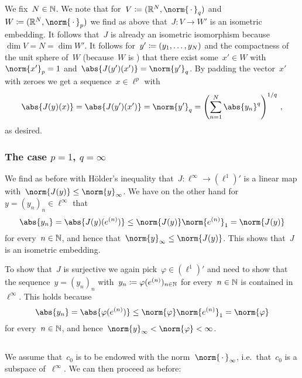 We fix~$N \in \mathbb{N}$.
We note that for~$V \defined (\Real^N, \norm{\,\cdot\,}_q)$ and~$W \defined (\Real^N, \norm{\,\cdot\,}_p)$ we find as above that~$J \colon V \to W'$ is an isometric embedding.
It follows that~$J$ is already an isometric isomorphism because~$\dim V = N = \dim W'$.
It follows for~$y' \coloneqq (y_1, \dotsc, y_N)$ and the compactness of the unit sphere of~$W$ (because~$W$ is {\fd}) that there exist some~$x' \in W$ with~$\norm{x'}_p = 1$ and~$\abs{J(y')(x')} = \norm{y'}_q$.
By padding the vector~$x'$ with zeroes we get a sequence~$x \in \ell^p$ with
\[
    \abs{J(y)(x)}
  = \abs{J(y')(x')}
  = \norm{y'}_q
  = \left( \sum_{n=1}^N \abs{y_n}^q \right)^{1/q} \,,
\]
as desired.



\subsubsection*{The case $p = 1$, $q = \infty$}

We find as before with Hölder’s inequality that~$J \colon \ell^\infty \to (\ell^1)'$ is a {\welldef} linear map with~$\norm{J(y)} \leq \norm{y}_\infty$.
We have on the other hand for~$y = (y_n)_n \in \ell^\infty$ that
\[
        \abs{y_n}
  =     \abs{ J(y)(e^{(n)}) }
  \leq  \norm{J(y)} \norm{ e^{(n)} }_1
  =     \norm{J(y)}
\]
for every~$n \in \mathbb{N}$, and hence that~$\norm{y}_\infty \leq \norm{J(y)}$.
This shows that~$J$ is an isometric embedding.

To show that~$J$ is surjective we again pick~$\varphi \in (\ell^1)'$ and need to show that the sequence~$y = (y_n)_n$ with~$y_n \coloneqq \varphi(e^{(n)})_{n \in \mathbb{N}}$ for every~$n \in \mathbb{N}$ is contained in~$\ell^\infty$.
This holds because
\[
        \abs{y_n}
  =     \abs{ \varphi(e^{(n)}) }
  \leq  \norm{\varphi} \norm{e^{(n)}}_1
  =     \norm{\varphi}
\]
for every~$n \in \mathbb{N}$, and hence~$\norm{y}_\infty < \norm{\varphi} < \infty$.





\subsection{}

We assume that~$c_0$ is to be endowed with the norm~$\norm{\,\cdot\,}_{\infty}$, i.e.\ that~$c_0$ is a subspace of~$\ell^\infty$.
We can then proceed as before:

